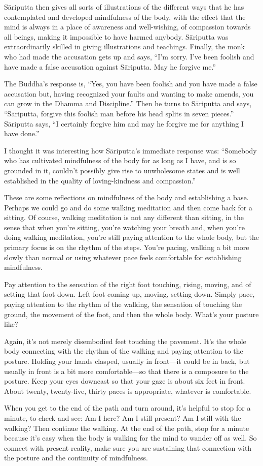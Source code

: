 Sāriputta then gives all sorts of illustrations of the different ways
that he has contemplated and developed mindfulness of the body, with the
effect that the mind is always in a place of awareness and well-wishing,
of compassion towards all beings, making it impossible to have harmed
anybody. Sāriputta was extraordinarily skilled in giving illustrations
and teachings. Finally, the monk who had made the accusation gets up and
says, “I’m sorry. I’ve been foolish and have made a false accusation
against Sāriputta. May he forgive me.”

The Buddha’s response is, “Yes, you have been foolish and you have made
a false accusation but, having recognized your faults and wanting to
make amends, you can grow in the Dhamma and Discipline.” Then he turns
to Sāriputta and says, “Sāriputta, forgive this foolish man before his
head splits in seven pieces.” Sāriputta says, “I certainly forgive him
and may he forgive me for anything I have done.”

I thought it was interesting how Sāriputta’s immediate response was:
“Somebody who has cultivated mindfulness of the body for as long as I
have, and is so grounded in it, couldn’t possibly give rise to
unwholesome states and is well established in the quality of
loving-kindness and compassion.”

These are some reflections on mindfulness of the body and establishing a
base. Perhaps we could go and do some walking meditation and then come
back for a sitting. Of course, walking meditation is not any different
than sitting, in the sense that when you’re sitting, you’re watching
your breath and, when you’re doing walking meditation, you’re still
paying attention to the whole body, but the primary focus is on the
rhythm of the steps. You’re pacing, walking a bit more slowly than
normal or using whatever pace feels comfortable for establishing
mindfulness.

Pay attention to the sensation of the right foot touching, rising,
moving, and of setting that foot down. Left foot coming up, moving,
setting down. Simply pace, paying attention to the rhythm of the
walking, the sensation of touching the ground, the movement of the foot,
and then the whole body. What’s your posture like?

Again, it’s not merely disembodied feet touching the pavement. It’s the
whole body connecting with the rhythm of the walking and paying
attention to the posture. Holding your hands clasped, usually in
front—it could be in back, but usually in front is a bit more
comfortable—so that there is a composure to the posture. Keep your eyes
downcast so that your gaze is about six feet in front. About twenty,
twenty-five, thirty paces is appropriate, whatever is comfortable.

When you get to the end of the path and turn around, it’s helpful to
stop for a minute, to check and see: Am I here? Am I still present? Am I
still with the walking? Then continue the walking. At the end of the
path, stop for a minute because it’s easy when the body is walking for
the mind to wander off as well. So connect with present reality, make
sure you are sustaining that connection with the posture and the
continuity of mindfulness.
